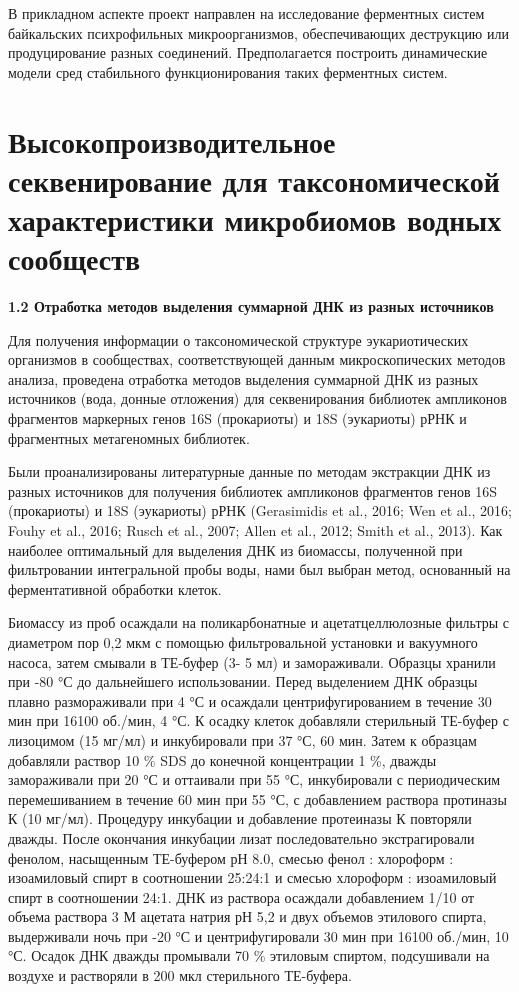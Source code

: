 \documentclass[a4paper,12pt,openany,final]{extreport}
\begin{document}
В прикладном аспекте проект направлен на исследование ферментных систем
байкальских психрофильных микроорганизмов, обеспечивающих деструкцию или
продуцирование разных соединений. Предполагается построить динамические
модели сред стабильного функционирования таких ферментных систем.

\chapter{Высокопроизводительное секвенирование для таксономической характеристики микробиомов водных сообществ}
\label{chap:1}

\textbf{1.2 Отработка методов выделения суммарной ДНК из разных
источников}

Для получения информации о таксономической структуре эукариотических
организмов в сообществах, соответствующей данным микроскопических
методов анализа, проведена отработка методов выделения суммарной ДНК из
разных источников (вода, донные отложения) для секвенирования библиотек
ампликонов фрагментов маркерных генов 16S (прокариоты) и 18S (эукариоты)
рРНК и фрагментных метагеномных библиотек.

Были проанализированы литературные данные по методам экстракции ДНК из
разных источников для получения библиотек ампликонов фрагментов генов
16S (прокариоты) и 18S (эукариоты) рРНК (Gerasimidis et al., 2016; Wen
et al., 2016; Fouhy et al., 2016; Rusch et al., 2007; Allen et al.,
2012; Smith et al., 2013). Как наиболее оптимальный для выделения ДНК из
биомассы, полученной при фильтровании интегральной пробы воды, нами был
выбран метод, основанный на ферментативной обработки клеток.

Биомассу из проб осаждали на поликарбонатные и ацетатцеллюлозные фильтры
с диаметром пор 0,2 мкм с помощью фильтровальной установки и вакуумного
насоса, затем смывали в ТЕ-буфер (3- 5 мл) и замораживали. Образцы
хранили при -80 °С до дальнейшего использовании. Перед выделением ДНК
образцы плавно размораживали при 4 °С и осаждали центрифугированием в
течение 30 мин при 16100 об./мин, 4 °С. К осадку клеток добавляли
стерильный ТЕ-буфер с лизоцимом (15 мг/мл) и инкубировали при 37 °С, 60
мин. Затем к образцам добавляли раствор 10 \% SDS до конечной
концентрации 1 \%, дважды замораживали при 20 °С и оттаивали при 55 °С,
инкубировали с периодическим перемешиванием в течение 60 мин при 55 °С,
с добавлением раствора протиназы К (10 мг/мл). Процедуру инкубации и
добавление протеиназы К повторяли дважды. После окончания инкубации
лизат последовательно экстрагировали фенолом, насыщенным ТЕ-буфером рН
8.0, смесью фенол : хлороформ : изоамиловый спирт в соотношении 25:24:1
и смесью хлороформ : изоамиловый спирт в соотношении 24:1. ДНК из
раствора осаждали добавлением 1/10 от объема раствора 3 М ацетата натрия
рН 5,2 и двух объемов этилового спирта, выдерживали ночь при -20 °С и
центрифугировали 30 мин при 16100 об./мин, 10 °С. Осадок ДНК дважды
промывали 70 \% этиловым спиртом, подсушивали на воздухе и растворяли в
200 мкл стерильного ТЕ-буфера.
\end{document}

